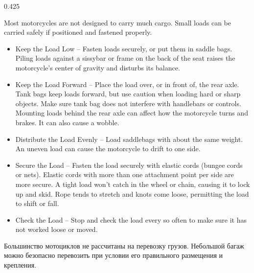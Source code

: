 


\begin{langblock}{0.425}
	\begin{eng}
	
	Most motorcycles are not designed to carry much cargo. Small loads can be carried safely if positioned and fastened properly.
	
	
	\begin{itemize}[noitemsep]
		\item Keep the Load Low -- Fasten loads securely, or put them in saddle bags.  Piling loads against a sissybar or frame on the back of the seat raises the motorcycle's center of gravity and disturbs its balance.
		\item Keep the Load Forward -- Place the load over, or in front of, the rear axle. Tank bags keep loads forward, but use caution when loading hard or sharp objects. Make sure tank bag does not interfere with handlebars or controls. Mounting loads behind the rear axle can affect how the motorcycle turns and brakes. It can also cause a wobble.
		\item Distribute the Load Evenly -- Load saddlebags with about the same weight. An uneven load can cause the motorcycle to drift to one side.
		\item Secure the Load -- Fasten the load securely with elastic cords (bungee cords or nets). Elastic cords with more than one attachment point per side are more secure. A tight load won't catch in the wheel or chain, causing it to lock up and skid. Rope tends to stretch and knots come loose, permitting the load to shift or fall.
		\item Check the Load -- Stop and check the load every so often to make sure it has not worked loose or moved.
	\end{itemize}
	\end{eng}
	\begin{rus}
		
		Большинство мотоциклов не рассчитаны на перевозку грузов. Небольшой багаж можно безопасно перевозить при условии его правильного размещения и крепления.
		

\end{rus}
\end{langblock}
